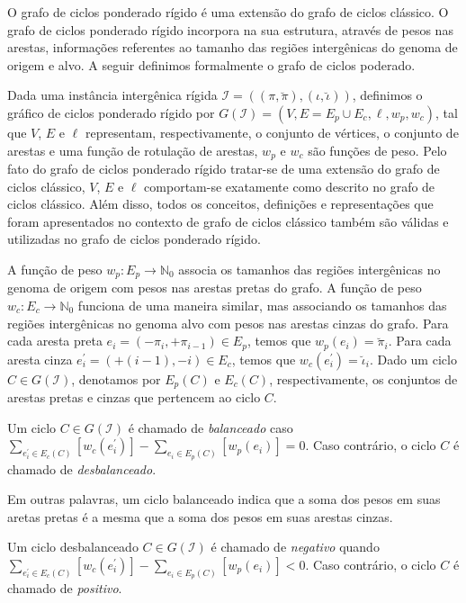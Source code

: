 O grafo de ciclos ponderado rígido é uma extensão do grafo de ciclos clássico. O grafo de ciclos ponderado rígido incorpora na sua estrutura, através de pesos nas arestas, informações referentes ao tamanho das regiões intergênicas do genoma de origem e alvo. A seguir definimos formalmente o grafo de ciclos poderado.

Dada uma instância intergênica rígida $\mathcal{I} = ((\pi,\breve\pi),(\iota,\breve\iota))$, definimos o gráfico de ciclos ponderado rígido por $G(\mathcal{I}) = (V, E=E_p \cup E_c, \ell, w_p, w_c)$, tal que $V$, $E$ e $\ell$ representam, respectivamente, o conjunto de vértices, o conjunto de arestas e uma função de rotulação de arestas, $w_p$ e $w_c$ são funções de peso. Pelo fato do grafo de ciclos ponderado rígido tratar-se de uma extensão do grafo de ciclos clássico, $V$, $E$ e $\ell$ comportam-se exatamente como descrito no grafo de ciclos clássico. Além disso, todos os conceitos, definições e representações que foram apresentados no contexto de grafo de ciclos clássico também são válidas e utilizadas no grafo de ciclos ponderado rígido.

A função de peso $w_p : E_p \rightarrow \mathbb{N}_0$ associa os tamanhos das regiões intergênicas no genoma de origem com pesos nas arestas pretas do grafo. A função de peso $w_c : E_c \rightarrow \mathbb{N}_0$ funciona de uma maneira similar, mas associando os tamanhos das regiões intergênicas no genoma alvo com pesos nas arestas cinzas do grafo. Para cada aresta preta $e_i = (-\pi_i, +\pi_{i-1}) \in E_p$, temos que $w_p(e_i) = \breve\pi_i$. Para cada aresta cinza $e^{\prime}_i = (+(i-1), -i) \in E_c$, temos que $w_c(e^{\prime}_i) = \breve\iota_i$. Dado um ciclo $C \in G(\mathcal{I})$, denotamos por $E_p(C)$ e $E_c(C)$, respectivamente, os conjuntos de arestas pretas e cinzas que pertencem ao ciclo $C$. 

\begin{definition}
Um ciclo $C \in G(\mathcal{I})$ é chamado de \emph{balanceado} caso $\sum_{e^{\prime}_i \in E_c(C)} [w_c(e^{\prime}_i)] - \sum_{e_i \in E_p(C)} [w_p(e_i)] = 0$. Caso contrário, o ciclo $C$ é chamado de \emph{desbalanceado}.
\end{definition}

Em outras palavras, um ciclo balanceado indica que a soma dos pesos em suas aretas pretas é a mesma que a soma dos pesos em suas arestas cinzas. 

\begin{definition}
Um ciclo desbalanceado $C \in G(\mathcal{I})$ é chamado de \emph{negativo} quando $\sum_{e^{\prime}_i \in E_c(C)} [w_c(e^{\prime}_i)] - \sum_{e_i \in E_p(C)} [w_p(e_i)] < 0$. Caso contrário, o ciclo $C$ é chamado de \emph{positivo}.
\end{definition}

